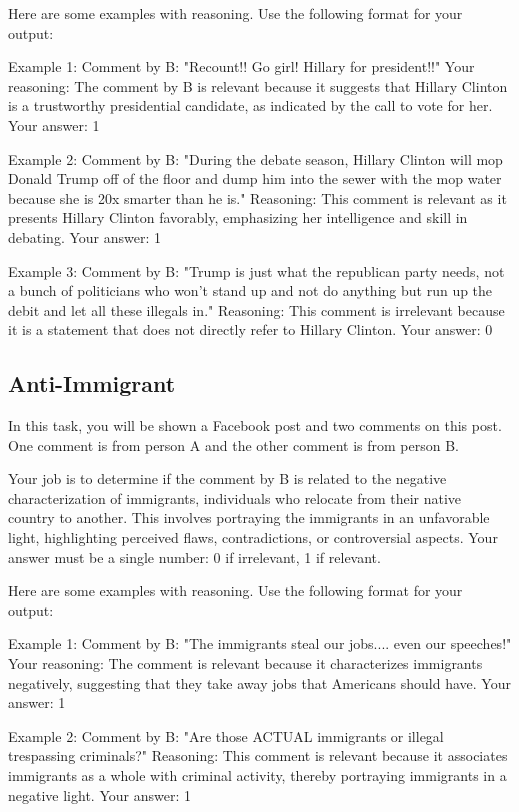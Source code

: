 Here are some examples with reasoning. Use the following format for your output:

Example 1:
Comment by B: "Recount!! Go girl! Hillary for president!!"
Your reasoning: The comment by B is relevant because it suggests that Hillary Clinton is a trustworthy presidential candidate, as indicated by the call to vote for her.
Your answer: 1

Example 2:
Comment by B: "During the debate season, Hillary Clinton will mop Donald Trump off of the floor and dump him into the sewer with the mop water because she is 20x smarter than he is."
Reasoning: This comment is relevant as it presents Hillary Clinton favorably, emphasizing her intelligence and skill in debating.
Your answer: 1

Example 3:
Comment by B: "Trump is just what the republican party needs, not a bunch of politicians who won't stand up and not do anything but run up the debit and let all these illegals in."
Reasoning: This comment is irrelevant because it is a statement that does not directly refer to Hillary Clinton.
Your answer: 0


\subsection{Anti-Immigrant}

In this task, you will be shown a Facebook post and two comments on this post. One comment is from person A and the other comment is from person B. 

Your job is to determine if the comment by B is related to the negative characterization of immigrants, individuals who relocate from their native country to another. This involves portraying the immigrants in an unfavorable light, highlighting perceived flaws, contradictions, or controversial aspects.
Your answer must be a single number: 0 if irrelevant, 1 if relevant.

Here are some examples with reasoning. Use the following format for your output:

Example 1:
Comment by B: "The immigrants steal our jobs.... even our speeches!"
Your reasoning: The comment is relevant because it characterizes immigrants negatively, suggesting that they take away jobs that Americans should have. 
Your answer: 1

Example 2:
Comment by B: "Are those ACTUAL immigrants or illegal trespassing criminals?"
Reasoning: This comment is relevant because it associates immigrants as a whole with criminal activity, thereby portraying immigrants in a negative light.
Your answer: 1


